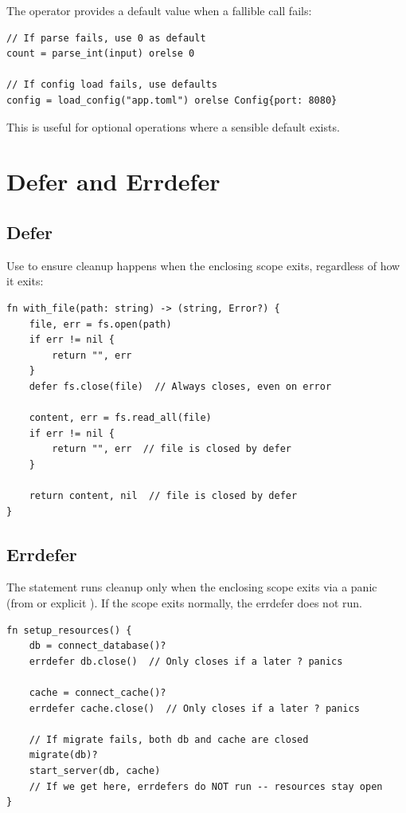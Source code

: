 The  operator provides a default value when a fallible call fails:

\begin{lstlisting}
// If parse fails, use 0 as default
count = parse_int(input) orelse 0

// If config load fails, use defaults
config = load_config("app.toml") orelse Config{port: 8080}
\end{lstlisting}

This is useful for optional operations where a sensible default exists.

\section{Defer and Errdefer}

\subsection{Defer}

Use  to ensure cleanup happens when the enclosing scope exits, regardless of how it exits:

\begin{lstlisting}
fn with_file(path: string) -> (string, Error?) {
    file, err = fs.open(path)
    if err != nil {
        return "", err
    }
    defer fs.close(file)  // Always closes, even on error

    content, err = fs.read_all(file)
    if err != nil {
        return "", err  // file is closed by defer
    }

    return content, nil  // file is closed by defer
}
\end{lstlisting}

\subsection{Errdefer}

The  statement runs cleanup only when the enclosing scope exits via a panic (from  or explicit ). If the scope exits normally, the errdefer does not run.

\begin{lstlisting}
fn setup_resources() {
    db = connect_database()?
    errdefer db.close()  // Only closes if a later ? panics

    cache = connect_cache()?
    errdefer cache.close()  // Only closes if a later ? panics

    // If migrate fails, both db and cache are closed
    migrate(db)?
    start_server(db, cache)
    // If we get here, errdefers do NOT run -- resources stay open
}
\end{lstlisting}

